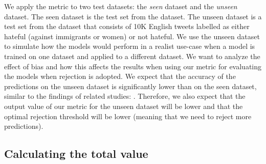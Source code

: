 %
We apply the metric to two test datasets: the \emph{seen} dataset and the \textit{unseen} dataset.
%
The seen dataset is the test set from the \citet{waseem2016hateful} dataset.
%
The unseen dataset is a test set from the \citet{basile2019semeval} dataset that consists of 10K English tweets labelled as either hateful (against immigrants or women) or not hateful.
%
We use the unseen dataset to simulate how the models would perform in a realist use-case when a model is trained on one dataset and applied to a different dataset.
%
We want to analyze the effect of bias and how this affects the results when using our metric for evaluating the models when rejection is adopted.
%
We expect that the accuracy of the predictions on the unseen dataset is significantly lower than on the seen dataset, similar to the findings of related studies: \citet{grondahl2018all, arango2019hate}.
%
Therefore, we also expect that the output value of our metric for the unseen dataset will be lower and that the optimal rejection threshold will be lower (meaning that we need to reject more predictions).
%


\subsection{Calculating the total value}
